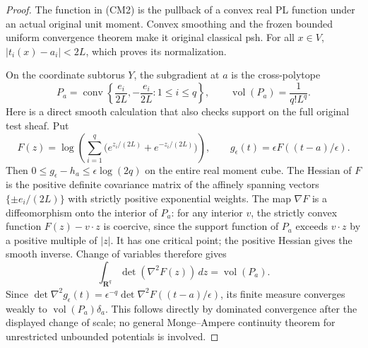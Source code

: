 \begin{proof}
The function in (CM2) is the pullback of a convex real PL function
under an actual original unit moment. Convex smoothing and the frozen
bounded uniform convergence theorem make it original classical psh.
For all $x\in V$, $|t_i(x)-a_i|<2L$, which proves its normalization.

On the coordinate subtorus $Y$, the subgradient at $a$ is the
cross-polytope
\[
                  P_a=\operatorname{conv}
                   \left\{\frac{e_i}{2L},-\frac{e_i}{2L}:1\leq i\leq q\right\},
             \qquad \operatorname{vol}(P_a)=\frac{1}{q!L^q}.
 \tag{CM5}
\]
Here is a direct smooth calculation that also checks support on
the full original test sheaf. Put
\[
 F(z)=\log\!\left(\sum_{i=1}^q
              \bigl(e^{z_i/(2L)}+e^{-z_i/(2L)}\bigr)\right),
       \qquad g_\epsilon(t)=\epsilon F((t-a)/\epsilon).
 \tag{CM5a}
\]
Then $0\leq g_\epsilon-h_a\leq\epsilon\log(2q)$ on the entire
real moment cube. The Hessian of $F$ is the positive definite
covariance matrix of the affinely spanning vectors
$\{\pm e_i/(2L)\}$ with strictly positive exponential weights.
The map $\nabla F$ is a diffeomorphism onto the interior of $P_a$:
for any interior $v$, the strictly convex function $F(z)-v\cdot z$
is coercive, since the support function of $P_a$ exceeds $v\cdot z$
by a positive multiple of $|z|$. It has one critical point;
the positive Hessian gives the smooth inverse. Change of variables
therefore gives
\[
                   \int_{\mathbf R^q}\det(\nabla^2F(z))\,dz
                          =\operatorname{vol}(P_a).
 \tag{CM5b}
\]
Since $\det\nabla^2g_\epsilon(t)
=\epsilon^{-q}\det\nabla^2F((t-a)/\epsilon)$, its finite
measure converges weakly to $\operatorname{vol}(P_a)\delta_a$.
This follows directly by dominated convergence after the displayed
change of scale; no general Monge--Ampere continuity theorem for
unrestricted unbounded potentials is involved.


\end{proof}
